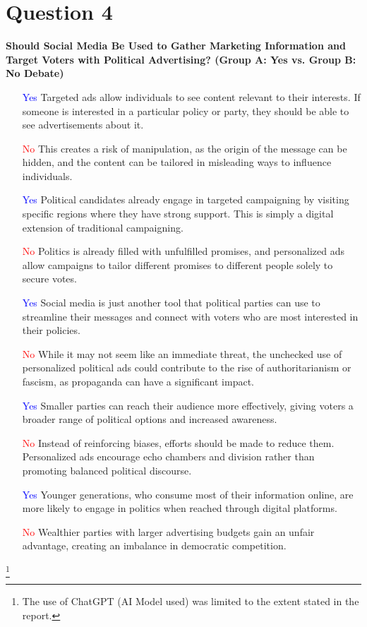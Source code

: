 \documentclass[12pt]{article}
\begin{document}
\section*{Question 4}
\textbf{Should Social Media Be Used to Gather Marketing Information and Target Voters with Political Advertising? (Group A: Yes vs. Group B: No Debate)}

\begin{itemize}
    \item [\textcolor{blue}{Yes}] Targeted ads allow individuals to see content relevant to their interests. If someone is interested in a particular policy or party, they should be able to see advertisements about it.  
    \item [\textcolor{red}{No}] This creates a risk of manipulation, as the origin of the message can be hidden, and the content can be tailored in misleading ways to influence individuals.  
    \item [\textcolor{blue}{Yes}] Political candidates already engage in targeted campaigning by visiting specific regions where they have strong support. This is simply a digital extension of traditional campaigning.  
    \item [\textcolor{red}{No}] Politics is already filled with unfulfilled promises, and personalized ads allow campaigns to tailor different promises to different people solely to secure votes.  
    \item [\textcolor{blue}{Yes}] Social media is just another tool that political parties can use to streamline their messages and connect with voters who are most interested in their policies.  
    \item [\textcolor{red}{No}] While it may not seem like an immediate threat, the unchecked use of personalized political ads could contribute to the rise of authoritarianism or fascism, as propaganda can have a significant impact.  
    \item [\textcolor{blue}{Yes}] Smaller parties can reach their audience more effectively, giving voters a broader range of political options and increased awareness.  
    \item [\textcolor{red}{No}] Instead of reinforcing biases, efforts should be made to reduce them. Personalized ads encourage echo chambers and division rather than promoting balanced political discourse.  
    \item [\textcolor{blue}{Yes}] Younger generations, who consume most of their information online, are more likely to engage in politics when reached through digital platforms.  
    \item [\textcolor{red}{No}] Wealthier parties with larger advertising budgets gain an unfair advantage, creating an imbalance in democratic competition.  
\end{itemize}
\footnote{The use of ChatGPT (AI Model used) was limited to the extent stated in the report.}
\pagebreak


\end{document}
